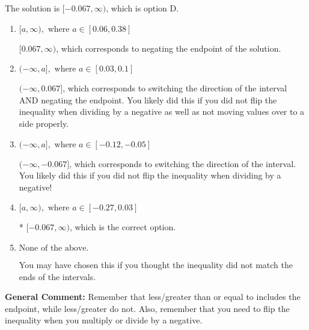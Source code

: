 \documentclass{extbook}[14pt]
\begin{document}
\begin{enumerate}
{The solution is \( [-0.067, \infty) \), which is option D.\begin{enumerate}[label=\Alph*.]
\item \( [a, \infty), \text{ where } a \in [0.06, 0.38] \)

 $[0.067, \infty)$, which corresponds to negating the endpoint of the solution.
\item \( (-\infty, a], \text{ where } a \in [0.03, 0.1] \)

 $(-\infty, 0.067]$, which corresponds to switching the direction of the interval AND negating the endpoint. You likely did this if you did not flip the inequality when dividing by a negative as well as not moving values over to a side properly.
\item \( (-\infty, a], \text{ where } a \in [-0.12, -0.05] \)

 $(-\infty, -0.067]$, which corresponds to switching the direction of the interval. You likely did this if you did not flip the inequality when dividing by a negative!
\item \( [a, \infty), \text{ where } a \in [-0.27, 0.03] \)

* $[-0.067, \infty)$, which is the correct option.
\item \( \text{None of the above}. \)

You may have chosen this if you thought the inequality did not match the ends of the intervals.
\end{enumerate}

\textbf{General Comment:} Remember that less/greater than or equal to includes the endpoint, while less/greater do not. Also, remember that you need to flip the inequality when you multiply or divide by a negative.
}
\end{enumerate}
\end{document}

